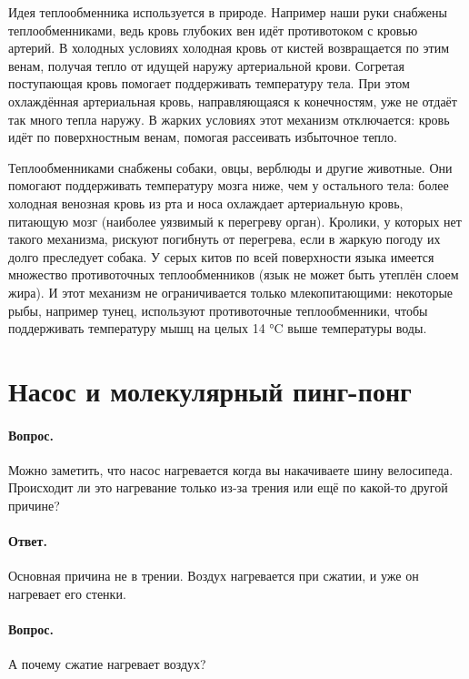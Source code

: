 Идея теплообменника используется в природе.
Например наши руки снабжены теплообменниками, ведь кровь глубоких вен идёт противотоком с кровью артерий.
В холодных условиях холодная кровь от кистей возвращается по этим венам, получая тепло от идущей наружу артериальной крови. Согретая поступающая кровь помогает поддерживать температуру тела.
При этом охлаждённая артериальная кровь, направляющаяся к конечностям, уже не отдаёт так много тепла наружу.
В жарких условиях этот механизм отключается: кровь идёт по поверхностным венам, помогая рассеивать избыточное тепло.

Теплообменниками снабжены собаки, овцы, верблюды и другие животные.
Они помогают поддерживать температуру мозга ниже, чем у остального тела: более холодная венозная кровь из рта и носа охлаждает артериальную кровь, питающую мозг (наиболее уязвимый к перегреву орган).
Кролики, у которых нет такого механизма, рискуют погибнуть от перегрева, если в жаркую погоду их долго преследует собака.
У серых китов по всей поверхности языка имеется множество противоточных теплообменников (язык не может быть утеплён слоем жира).
И этот механизм не ограничивается только млекопитающими: некоторые рыбы, например тунец, используют противоточные теплообменники, чтобы поддерживать температуру мышц на целых 14 °C выше температуры воды.

\section{Насос и молекулярный пинг-понг}
\label{Насос и молекулярный пинг-понг}

\paragraph{Вопрос.}
Можно заметить, что насос нагревается когда вы накачиваете шину велосипеда.
Происходит ли это нагревание только из-за трения или ещё по какой-то другой причине?

\paragraph{Ответ.}
Основная причина не в трении.
Воздух нагревается при сжатии, и уже он нагревает его стенки.

\paragraph{Вопрос.} А почему сжатие нагревает воздух?

